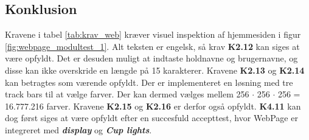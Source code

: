 \documentclass[Modultest/Modultest_main.tex]{subfiles}
\begin{document}
\subsection{Konklusion}
Kravene i tabel \ref{tab:krav_web} kræver visuel inspektion af hjemmesiden i figur \ref{fig:webpage_modultest_1}. Alt teksten er engelsk, så krav \textbf{K2.12} kan siges at være opfyldt. Det er desuden muligt at indtaste holdnavne og brugernavne, og disse kan ikke overskride en længde på 15 karakterer. Kravene \textbf{K2.13} og \textbf{K2.14} kan betragtes som værende opfyldt. Der er implementeret en løsning med tre track bars til at vælge farver. Der kan dermed vælges mellem 256 $\cdot$ 256 $\cdot$ 256 = 16.777.216 farver. Kravene \textbf{K2.15} og \textbf{K2.16} er derfor også opfyldt. \textbf{K4.11} kan dog først siges at være opfyldt efter en succesfuld accepttest, hvor WebPage er integreret med \textit{\textbf{display}} og \textit{\textbf{Cup lights}}.
\end{document}
